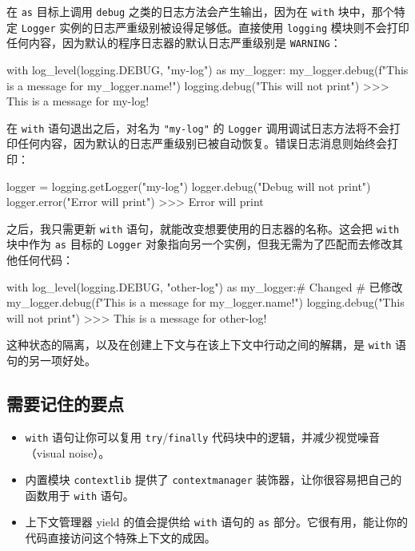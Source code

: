 在 \texttt{as} 目标上调用 \texttt{debug} 之类的日志方法会产生输出，因为在 \texttt{with} 块中，那个特定 \texttt{Logger} 实例的日志严重级别被设得足够低。直接使用 \texttt{logging} 模块则不会打印任何内容，因为默认的程序日志器的默认日志严重级别是 \texttt{WARNING}：

\begin{codebox}[python]
with log_level(logging.DEBUG, "my-log") as my_logger:
    my_logger.debug(f"This is a message for {my_logger.name}!")
    logging.debug("This will not print")
>>>
This is a message for my-log!
\end{codebox}

在 \texttt{with} 语句退出之后，对名为 \texttt{"my-log"} 的 \texttt{Logger} 调用调试日志方法将不会打印任何内容，因为默认的日志严重级别已被自动恢复。错误日志消息则始终会打印：

\begin{codebox}[python]
logger = logging.getLogger("my-log")
logger.debug("Debug will not print")
logger.error("Error will print")
>>>
Error will print
\end{codebox}

之后，我只需更新 \texttt{with} 语句，就能改变想要使用的日志器的名称。这会把 \texttt{with} 块中作为 \texttt{as} 目标的 \texttt{Logger} 对象指向另一个实例，但我无需为了匹配而去修改其他任何代码：

\begin{codebox}[python]
with log_level(logging.DEBUG, "other-log") as my_logger:# Changed
    # 已修改
    my_logger.debug(f"This is a message for {my_logger.name}!")
    logging.debug("This will not print")
>>>
This is a message for other-log!
\end{codebox}

这种状态的隔离，以及在创建上下文与在该上下文中行动之间的解耦，是 \texttt{with} 语句的另一项好处。

\subsection{需要记住的要点}

\begin{itemize}
\item \texttt{with} 语句让你可以复用 \texttt{try}/\texttt{finally} 代码块中的逻辑，并减少视觉噪音（visual noise）。
\item 内置模块 \texttt{contextlib} 提供了 \texttt{contextmanager} 装饰器，让你很容易把自己的函数用于 \texttt{with} 语句。
\item 上下文管理器 yield 的值会提供给 \texttt{with} 语句的 \texttt{as} 部分。它很有用，能让你的代码直接访问这个特殊上下文的成因。
\end{itemize}

